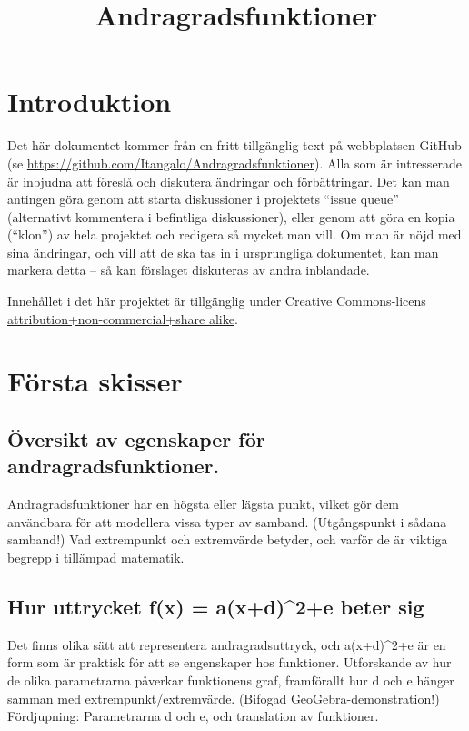\documentclass[12pt]{article}
\title{Andragradsfunktioner}
\date{}
\begin{document}
  \maketitle
  
  
  
  \section{Introduktion}
  Det här dokumentet kommer från en fritt tillgänglig text på webbplatsen GitHub (se \url{https://github.com/Itangalo/Andragradsfunktioner}).
  Alla som är intresserade är inbjudna att föreslå och diskutera ändringar och förbättringar.
  Det kan man antingen göra genom att starta diskussioner i projektets ``issue queue'' (alternativt kommentera i befintliga diskussioner), eller genom att göra en kopia (``klon'') av hela projektet och redigera så mycket man vill.
  Om man är nöjd med sina ändringar, och vill att de ska tas in i ursprungliga dokumentet, kan man markera detta -- så kan förslaget diskuteras av andra inblandade.

  Innehållet i det här projektet är tillgänglig under Creative Commons-licens \href{http://creativecommons.org/licenses/by-nc-sa/3.0/}{attribution+non-commercial+share alike}.


  \section{Första skisser}

  \subsection{Översikt av egenskaper för andragradsfunktioner.}
  Andragradsfunktioner har en högsta eller lägsta punkt, vilket gör dem användbara för att modellera vissa typer av samband.
  (Utgångspunkt i sådana samband!)
  Vad extrempunkt och extremvärde betyder, och varför de är viktiga begrepp i tillämpad matematik.

  \subsection{Hur uttrycket f(x) = a(x+d)^2+e beter sig}
  Det finns olika sätt att representera andragradsuttryck, och a(x+d)^2+e är en form som är praktisk för att se engenskaper hos funktioner.
  Utforskande av hur de olika parametrarna påverkar funktionens graf, framförallt hur d och e hänger samman med extrempunkt/extremvärde.
  (Bifogad GeoGebra-demonstration!)
  Fördjupning: Parametrarna d och e, och translation av funktioner.
  
\end{document}
